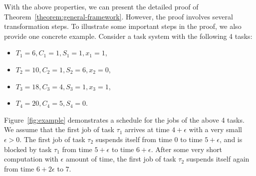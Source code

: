 \documentclass[10pt,conference,preprint]{IEEEtran}
\begin{document}
With the above properties, we can present the detailed proof of
Theorem~\ref{theorem:general-framework}. However, the proof involves
several transformation steps. To illustrate some important steps in
the proof, we also provide one concrete example. Consider a task
system with the following 4 tasks:
\begin{itemize}
\item $T_1 = 6, C_1 = 1, S_1 = 1, x_1=1$,
\item $T_2 = 10, C_2 = 1, S_2 = 6, x_2=0$,
\item $T_3 = 18, C_3 = 4, S_3 = 1, x_3=1$,
\item $T_4 = 20, C_4 = 5, S_4 = 0$.
\end{itemize}

Figure~\ref{fig:example} demonstrates a schedule for the jobs of the
above 4 tasks. We assume that the first job of task $\tau_1$ arrives
at time $4+\epsilon$ with a very small $\epsilon > 0$. The first job
of task $\tau_2$ suspends itself from time $0$ to time $5+\epsilon$,
and is blocked by task $\tau_1$ from time $5+\epsilon$ to time
$6+\epsilon$. After some very short computation with $\epsilon$ amount
of time, the first job of task $\tau_2$ suspends itself again from
time $6+2\epsilon$ to $7$.   



\begin{figure*}[t]
  \centering
  
\caption{An illustrative example of Step 1 in the proof of Theorem~\ref{theorem:general-framework}.}
\label{fig:example}  
\end{figure*}
\end{document}
